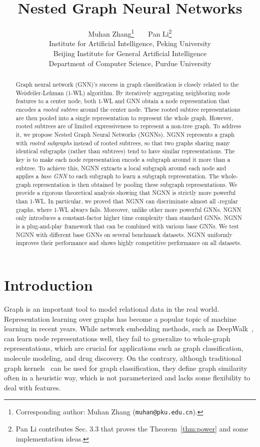 \documentclass{article}
\title{Nested Graph Neural Networks}
\author{Muhan Zhang\thanks{Corresponding author: Muhan Zhang (\texttt{muhan@pku.edu.cn}).}~~~~Pan Li\thanks{Pan Li contributes Sec. 3.3 that proves the Theorem~\ref{thm:power} and some implementation ideas.}\\
  Institute for Artificial Intelligence, Peking University\\ 
  Beijing Institute for General Artificial Intelligence\\ 
  Department of Computer Science, Purdue University\\ 
}
\begin{document}
\maketitle

\begin{abstract}
Graph neural network (GNN)'s success in graph classification is closely related to the Weisfeiler-Lehman (1-WL) algorithm. By iteratively aggregating neighboring node features to a center node, both 1-WL and GNN obtain a node representation that encodes a \textit{rooted subtree} around the center node. These rooted subtree representations are then pooled into a single representation to represent the whole graph. However, rooted subtrees are of limited expressiveness to represent a non-tree graph. To address it, we propose Nested Graph Neural Networks (NGNNs). NGNN represents a graph with \textit{rooted subgraphs} instead of rooted subtrees, so that two graphs sharing many identical subgraphs (rather than subtrees) tend to have similar representations. The key is to make each node representation encode a subgraph around it more than a subtree. To achieve this, NGNN extracts a local subgraph around each node and applies a \textit{base GNN} to each subgraph to learn a subgraph representation. The whole-graph representation is then obtained by pooling these subgraph representations. We provide a rigorous theoretical analysis showing that NGNN is strictly more powerful than 1-WL. In particular, we proved that NGNN can discriminate almost all -regular graphs, where 1-WL always fails. Moreover, unlike other more powerful GNNs, NGNN only introduces a constant-factor higher time complexity than standard GNNs. NGNN is a plug-and-play framework that can be combined with various base GNNs. We test NGNN with different base GNNs on several benchmark datasets. NGNN uniformly improves their performance and shows highly competitive performance on all datasets.
\end{abstract}

\section{Introduction}
Graph is an important tool to model relational data in the real world. Representation learning over graphs has become a popular topic of machine learning in recent years. While network embedding methods, such as DeepWalk~\citep{perozzi2014deepwalk}, can learn node representations well, they fail to generalize to whole-graph representations, which are crucial for applications such as graph classification, molecule modeling, and drug discovery. On the contrary, although traditional graph kernels~\citep{haussler1999convolution,shervashidze2009efficient,kondor2009graphlet,borgwardt2005shortest,neumann2016propagation,shervashidze2011weisfeiler} can be used for graph classification, they define graph similarity often in a heuristic way, which is not parameterized and lacks some flexibility to deal with features. 
\end{document}
